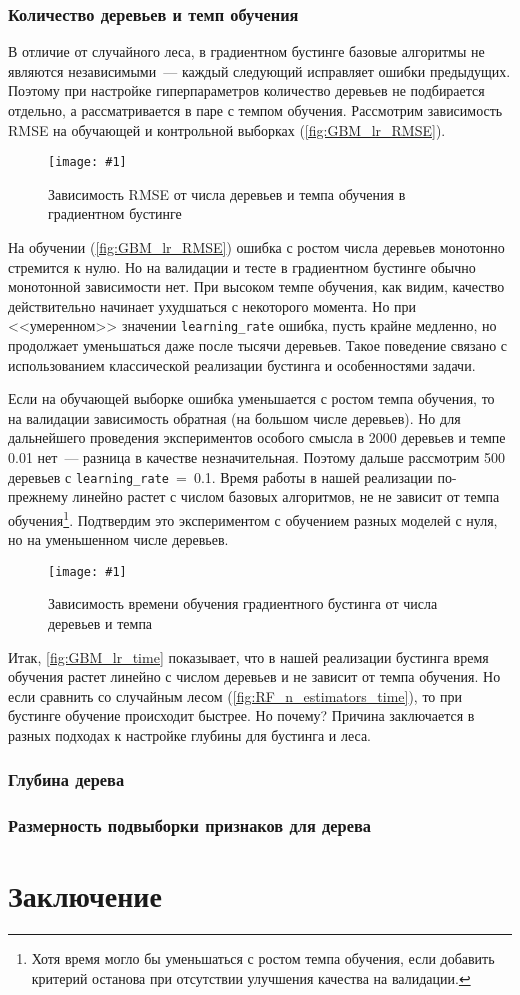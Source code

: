 \documentclass[12pt]{article}
\newcommand{\mpl}[2]{
    \begin{figure}[!h]
        \texttt{[image: \#1]}
        \centering
        \caption{#2}
        \label{fig:#1}
     \end{figure}
}
\begin{document}
\subsubsection{Количество деревьев и темп обучения}
В отличие от случайного леса, в градиентном бустинге базовые алгоритмы не являются независимыми~--- каждый следующий исправляет ошибки предыдущих. Поэтому при настройке гиперпараметров количество деревьев не подбирается отдельно, а рассматривается в паре с темпом обучения. Рассмотрим зависимость RMSE на обучающей и контрольной выборках (\autoref{fig:GBM_lr_RMSE}).

\mpl{GBM_lr_RMSE}{Зависимость RMSE от числа деревьев и темпа обучения в градиентном бустинге}

На обучении (\autoref{fig:GBM_lr_RMSE}) ошибка с ростом числа деревьев монотонно стремится к нулю. Но на валидации и тесте в градиентном бустинге обычно монотонной зависимости нет. При высоком темпе обучения, как видим, качество действительно начинает ухудшаться с некоторого момента. Но при <<умеренном>> значении \verb|learning_rate| ошибка, пусть крайне медленно, но продолжает уменьшаться даже после тысячи деревьев. Такое поведение связано с использованием классической реализации бустинга и особенностями задачи. 

Если на обучающей выборке ошибка уменьшается с ростом темпа обучения, то на валидации зависимость обратная (на большом числе деревьев). Но для дальнейшего проведения экспериментов особого смысла в 2000 деревьев и темпе 0.01 нет~--- разница в качестве незначительная. Поэтому дальше рассмотрим 500 деревьев с \verb|learning_rate|~=~0.1. Время работы в нашей реализации по-прежнему линейно растет с числом базовых алгоритмов, не не зависит от темпа обучения\footnote{Хотя время могло бы уменьшаться с ростом темпа обучения, если добавить критерий останова при отсутствии улучшения качества на валидации.}. Подтвердим это экспериментом с обучением разных моделей с нуля, но на уменьшенном числе деревьев.

\mpl{GBM_lr_time}{Зависимость времени обучения градиентного бустинга от числа деревьев и темпа}

Итак, \autoref{fig:GBM_lr_time} показывает, что в нашей реализации бустинга время обучения растет линейно с числом деревьев и не зависит от темпа обучения. Но если сравнить со случайным лесом (\autoref{fig:RF_n_estimators_time}), то при бустинге обучение происходит быстрее. Но почему? Причина заключается в разных подходах к настройке глубины для бустинга и леса.

\subsubsection{Глубина дерева}
\subsubsection{Размерность подвыборки признаков для дерева}
\section{Заключение}
\end{document}
